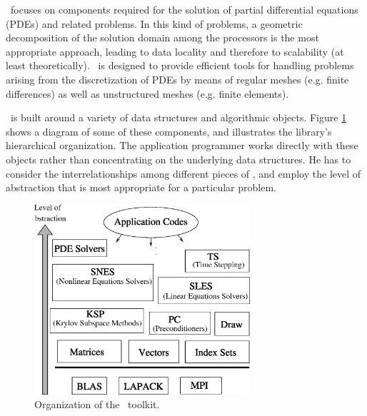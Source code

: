 	\petsc\ focuses on components required for the solution of partial differential equations (PDEs) and related problems. In this kind of problems, a geometric decomposition of the solution domain among the processors is the most appropriate approach, leading to data locality and therefore to scalability (at least theoretically). \petsc\ is designed to provide efficient tools for handling problems arising from the discretization of PDEs by means of regular meshes (e.g. finite differences) as well as unstructured meshes (e.g. finite elements).

	\petsc\ is built around a variety of data structures and algorithmic objects. Figure \ref{fig:petsc} shows a diagram of some of these components, and illustrates the library's hierarchical organization. The application programmer works directly with these objects rather than concentrating on the underlying data structures. He has to consider the interrelationships among different pieces of \petsc, and employ the level of abstraction that is most appropriate for a particular problem.  

\begin{figure}
\centering
\includegraphics[width=8cm]{petscwww.eps}
\caption{\label{fig:petsc}Organization of the \petsc\ toolkit.}
\end{figure}

